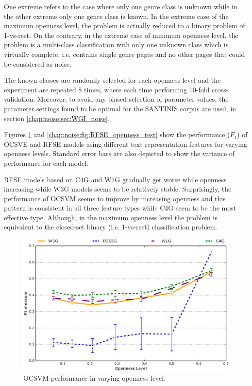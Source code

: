One extreme refers to the case where only one genre class is unknown while in the other extreme only one genre class is known. In the extreme case of the maximum openness level, the problem is actually reduced to a binary problem of 1-vs-rest. On the contrary, in the extreme case of minimum openness level, the problem is a multi-class classification with only one unknown class which is virtually complete, i.e. contains single genre pages and no other pages that could be considered as noise.

The known classes are randomly selected for each openness level and the experiment are repeated 8 times, where each time performing 10-fold cross-validation. Moreover, to avoid any biased selection of parameter values, the parameter settings found to be optimal for the SANTINIS corpus are used, in section \ref{chap:noise:sec:WGI_noise}.

Figures \ref{chap:noise:fig:OCSVME_openness_test} and \ref{chap:noise:fig:RFSE_openness_test} show the performance ($F_{1}$) of OCSVE and RFSE models using different text representation features for varying openness levels. Standard error bars are also depicted to show the variance of performance for each model. 

RFSE models based on C4G and W1G gradually get worse while openness increasing while W3G models seems to be relatively stable. Surprisingly, the performance of OCSVM seems to improve by increasing openness and this pattern is consistent in all three feature types while C4G seem to be the most effective type. Although, in the maximum openness level the problem is equivalent to the closed-set binary (i.e. 1-vs-rest) classification problem.

\begin{figure}[t]
\begin{center}
    \includegraphics[scale=0.45]{Figures/OCSVME_openness_test_graph.eps}
	\caption{OCSVM performance in varying openness level.}
	\label{chap:noise:fig:OCSVME_openness_test}
\end{center}
\end{figure}

